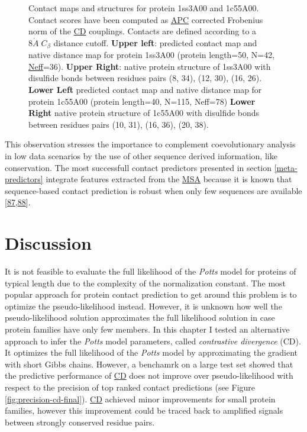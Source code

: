 \documentclass[11pt,a4paper,twoside]{book}
\newcommand{\Cb}{C_\beta}
\newcommand{\angstrom}{\mathring{A} \;}
\theoremstyle{definition}
\theoremstyle{definition}
\theoremstyle{remark}
\begin{document}
\begin{figure}
{}

\caption{Contact maps and
structures for protein 1ss3A00 and 1c55A00. Contact scores have been
computed as \protect\hyperlink{abbrev}{APC} corrected Frobenius norm of
the \protect\hyperlink{abbrev}{CD} couplings. Contacts are defined
according to a \(8 \angstrom \Cb\) distance cutoff. \textbf{Upper left}:
predicted contact map and native distance map for protein 1ss3A00
(protein length=50, N=42, \protect\hyperlink{abbrev}{Neff}=36).
\textbf{Upper Right}: native protein structure of 1ss3A00 with disulfide
bonds between residues pairs (8, 34), (12, 30), (16, 26). \textbf{Lower
Left} predicted contact map and native distance map for protein 1c55A00
(protein length=40, N=115, Neff=78) \textbf{Lower Right} native protein
structure of 1c55A00 with disulfide bonds between residues pairs (10,
31), (16, 36), (20, 38).}\label{fig:cd-predictions-small-neff-proteins}
\end{figure}

This observation stresses the importance to complement coevolutionary
analysis in low data scenarios by the use of other sequence derived
information, like conservation. The most successfull contact predictors
presented in section \ref{meta-predictors} integrate features extracted
from the \protect\hyperlink{abbrev}{MSA} because it is known that
sequence-based contact prediction is robust when only few sequences are
available
{[}\protect\hyperlink{ref-Stahl2017}{87},\protect\hyperlink{ref-He2017}{88}{]}.

\section{Discussion}\label{discussion-1}

It is not feasible to evaluate the full likelihood of the \emph{Potts}
model for proteins of typical length due to the complexity of the
normalization constant. The most popular approach for protein contact
prediction to get around this problem is to optimize the
pseudo-likelihood instead. However, it is unknown how well the
pseudo-likelihood solution approximates the full likelihood solution in
case protein families have only few members. In this chapter I tested an
alternative approach to infer the \emph{Potts} model parameters, called
\emph{contrastive divergence} (CD). It optimizes the full likelihood of
the \emph{Potts} model by approximating the gradient with short Gibbs
chains. However, a benchamrk on a large test set showed that the
predictive performance of \protect\hyperlink{abbrev}{CD} does not
improve over pseudo-likelihood with respect to the precision of top
ranked contact predictions (see Figure \ref{fig:precision-cd-final}).
\protect\hyperlink{abbrev}{CD} achieved minor improvements for small
protein families, however this improvement could be traced back to
amplified signals between strongly conserved residue pairs.
\end{document}
